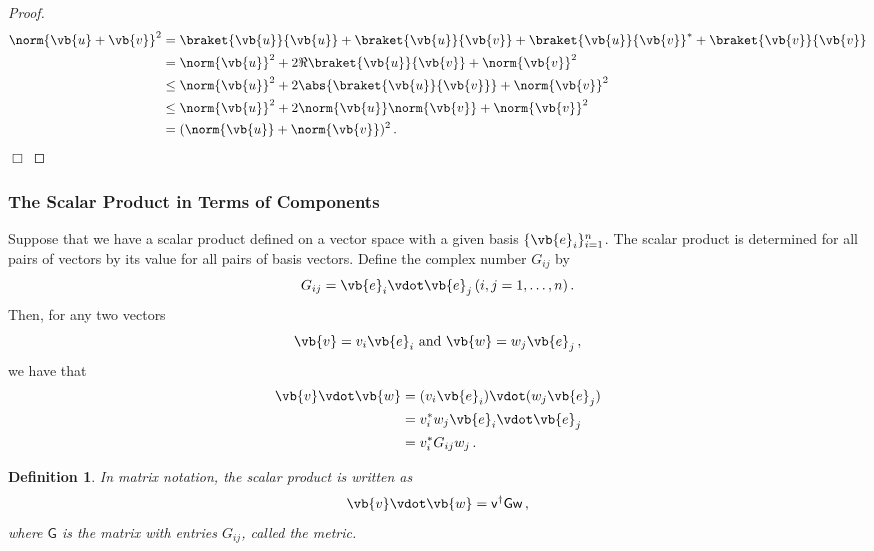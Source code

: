 \documentclass{article}
\theoremstyle{plain}\theoremheaderfont{\normalfont\itshape}\theorembodyfont{\rmfamily}\theoremseparator{.}\newtheorem*{rem}{Remark}\newtheorem*{ex}{Example}\newtheorem*{proof}{Proof}\newtheorem*{altp}{Alternative proof}
\theoremstyle{plain}\theoremheaderfont{\normalfont\bfseries}\theorembodyfont{\rmfamily}\theoremseparator{.}\newtheorem{thm}{Theorem}[section]\newtheorem{lem}[thm]{Lemma}\newtheorem{prop}[thm]{Proposition}\newtheorem*{cor}{Corollary}\newtheorem{defn}[thm]{Definition}\newtheorem{clm}[thm]{Claim}\newtheorem{clminproof}{Claim}
\theoremstyle{break}\theoremheaderfont{\normalfont\itshape}\theorembodyfont{\rmfamily}\theoremseparator{.\medskip}\newtheorem*{proofskip}{Proof}\newtheorem*{exs}{Examples}\newtheorem*{rems}{Remarks}
\theoremstyle{break}\theoremheaderfont{\normalfont\bfseries}\theorembodyfont{\rmfamily}\theoremseparator{.\medskip}\newtheorem{lemskip}[thm]{Lemma}\newtheorem{defnskip}[thm]{Definition}\newtheorem{propskip}[thm]{Proposition}\newtheorem{thmskip}[thm]{Theorem}
\numberwithin{equation}{section}
\newcommand{\qed}{\hfill\ensuremath{\Box}}
\begin{document}
	\begin{proof}
		\begin{align*}
			\norm{\vb{u}+\vb{v}}^2&=\braket{\vb{u}}{\vb{u}}+\braket{\vb{u}}{\vb{v}}+\braket{\vb{u}}{\vb{v}}^*+\braket{\vb{v}}{\vb{v}}\\
			&=\norm{\vb{u}}^2+2\Re{\braket{\vb{u}}{\vb{v}}}+\norm{\vb{v}}^2\\
			&\le\norm{\vb{u}}^2+2\abs{\braket{\vb{u}}{\vb{v}}}+\norm{\vb{v}}^2\\
			&\le\norm{\vb{u}}^2+2\norm{\vb{u}}\norm{\vb{v}}+\norm{\vb{v}}^2\\
			&=(\norm{\vb{u}}+\norm{\vb{v}})^2\,.
		\end{align*}\qed
	\end{proof}
	\subsubsection{The Scalar Product in Terms of Components}
	Suppose that we have a scalar product defined on a vector space with a given basis \(\{\vb{e}_i\}_{i=1}^n\).  The scalar product is determined for all pairs of vectors by its value for all pairs of basis vectors. Define the complex number \(G_{ij}\) by
	\[G_{ij}=\vb{e}_i\vdot\vb{e}_j\,(i,j=1,\dots,n)\,.\]
	Then, for any two vectors
	\[\vb{v}=v_i\vb{e}_i\text{ and }\vb{w}=w_j\vb{e}_j\,,\]
	we have that
	\begin{align*}
		\vb{v}\vdot\vb{w}&=(v_i\vb{e}_i)\vdot(w_j\vb{e}_j)\\
		&=v_i^*w_j\vb{e}_i\vdot\vb{e}_j\\
		&=v_i^*G_{ij}w_j\,.
	\end{align*}
	
	\begin{defn}
		In matrix notation, the scalar product is written as
		\[\vb{v}\vdot\vb{w}=\mathsf{v^\dagger Gw}\,,\]
		where \(\mathsf{G}\) is the matrix with entries \(G_{ij}\), called the \textit{metric}.
	\end{defn}
\end{document}
